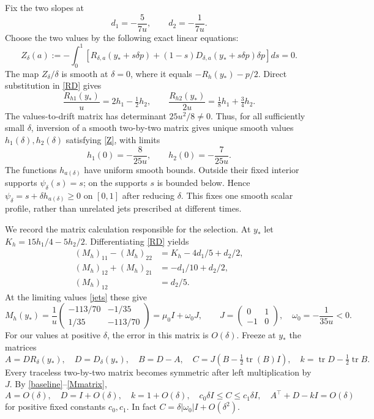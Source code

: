 \documentclass[11pt,a4paper]{article}
\newcommand{\tr}{\operatorname{tr}}
\begin{document}
Fix the two slopes at
\[
 d_1=-\frac5{7u},\qquad d_2=-\frac1{7u}.
\]
Choose the two values by the following exact linear equations:
\begin{equation}\label{Z}
 Z_\delta(a):=-\int_0^1
 \left[R_{\delta,a}(y_*+s\delta p)
 +(1-s)D_{\delta,a}(y_*+s\delta p)\delta p\right]ds=0.
\end{equation}
The map $Z_\delta/\delta$ is smooth at $\delta=0$, where it equals
$-R_h(y_*)-p/2$. Direct substitution in \eqref{RD} gives
\[
 \frac{R_{h1}(y_*)}{u}=2h_1-\tfrac12h_2,
 \qquad \frac{R_{h2}(y_*)}{2u}=\tfrac18h_1+\tfrac34h_2.
\]
The values-to-drift matrix has determinant $25u^2/8\ne0$.
Thus, for all sufficiently small $\delta$, inversion of a smooth
two-by-two matrix gives unique smooth values $h_1(\delta),h_2(\delta)$
satisfying \eqref{Z}, with limits
\begin{equation}\label{jets}
 h_1(0)=-\frac8{25u},\qquad h_2(0)=-\frac7{25u}.
\end{equation}
The functions $h_{a(\delta)}$ have uniform smooth bounds.
Outside their fixed interior supports $\psi_\delta(s)=s$;
on the supports $s$ is bounded below. Hence
$\psi_\delta=s+\delta h_{a(\delta)}\geq0$ on $[0,1]$ after reducing
$\delta$. This fixes one smooth scalar profile, rather than unrelated
jets prescribed at different times.

We record the matrix calculation responsible for the selection.
At $y_*$ let $K_h=15h_1/4-5h_2/2$. Differentiating \eqref{RD} yields
\[
 \begin{split}
 (M_h)_{11}-(M_h)_{22}&=K_h-4d_1/5+d_2/2,\\
 (M_h)_{12}+(M_h)_{21}&=-d_1/10+d_2/2,\\
 (M_h)_{12}&=d_2/5.
 \end{split}
\]
At the limiting values \eqref{jets} these give
\begin{equation}\label{Mmatrix}
 M_h(y_*)=\frac1u
 \begin{pmatrix}-113/70&-1/35\\1/35&-113/70\end{pmatrix}
 =\mu_0I+\omega_0J,
 \qquad J=\begin{pmatrix}0&1\\-1&0\end{pmatrix},\quad
 \omega_0=-\frac1{35u}<0.
\end{equation}
For our values at positive $\delta$, the error in this matrix is
$O(\delta)$. Freeze at $y_*$ the matrices
\begin{equation}\label{ABC}
 A=DR_\delta(y_*),\quad D=D_\delta(y_*),\quad B=D-A,
 \quad C=J\left(B-\tfrac12\tr(B)I\right),\quad
 k=\tr D-\tfrac12\tr B.
\end{equation}
Every traceless two-by-two matrix becomes symmetric after left
multiplication by $J$. By \eqref{baseline}--\eqref{Mmatrix},
\begin{equation}\label{coercivematrices}
 A=O(\delta),\quad D=I+O(\delta),\quad k=1+O(\delta),\quad
 c_0\delta I\leq C\leq c_1\delta I,\quad
 A^\top+D-kI=O(\delta)
\end{equation}
for positive fixed constants $c_0,c_1$. In fact
$C=\delta|\omega_0|I+O(\delta^2)$.
\end{document}
